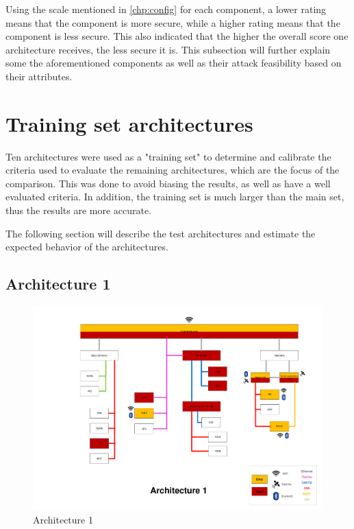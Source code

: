 Using the scale mentioned in \ref{chp:config} for each component, a lower rating means that the component is more secure, while a higher rating means that the component is less secure.
This also indicated that the higher the overall score one architecture receives, the less secure it is.
This subsection will further explain some the aforementioned components as well as their attack feasibility based on their attributes.


\section{Training set architectures}
\label{sec:trainingarch}

Ten architectures were used as a "training set" to determine and calibrate the criteria used to 
evaluate the remaining architectures, which are the focus of the comparison.
This was done to avoid biasing the results, as well as have a well evaluated criteria.
In addition, the training set is much larger than the main set, thus the results are more accurate.

The following section will describe the test architectures and estimate the expected behavior of the architectures.

\subsection*{Architecture 1}
\label{sec:arch1}

\begin{figure}[h!]
    \caption{Architecture 1}
    \includegraphics[width=\textwidth, page=1]{../Architectures-survey.pdf}
\end{figure}


